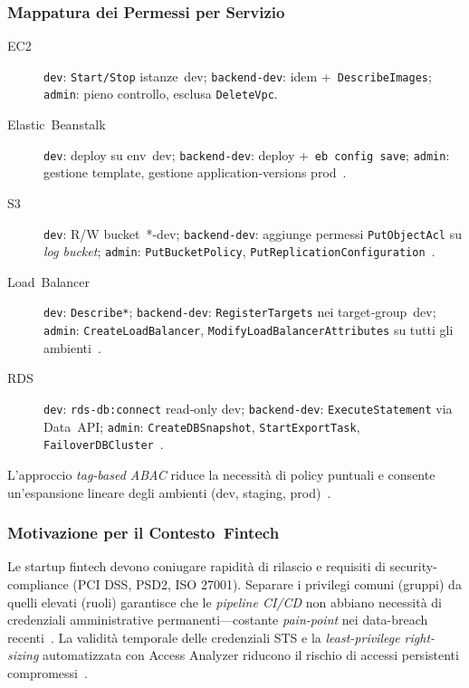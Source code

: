 \subsubsection{Mappatura dei Permessi per Servizio}
\label{subsubsec:mappa_servizi}

\begin{description}
  \item[EC2] \texttt{dev}: \texttt{Start/Stop} istanze dev; \texttt{backend‑dev}: idem + \texttt{DescribeImages}; \texttt{admin}: pieno controllo, esclusa
        \texttt{DeleteVpc}.  
  \item[Elastic Beanstalk] \texttt{dev}: deploy su env dev; \texttt{backend‑dev}: deploy + \texttt{eb config save}; \texttt{admin}: gestione template, gestione
        application‑versions prod \cite{AWSEBRole}.  
  \item[S3] \texttt{dev}: R/W bucket *-dev; \texttt{backend‑dev}: aggiunge permessi
        \texttt{PutObjectAcl} su \emph{log bucket}; \texttt{admin}:
        \texttt{PutBucketPolicy}, \texttt{PutReplicationConfiguration} \cite{AWSS3Security}.  
  \item[Load Balancer] \texttt{dev}: \texttt{Describe*}; \texttt{backend‑dev}: \texttt{RegisterTargets} nei target‑group dev; \texttt{admin}: \texttt{CreateLoadBalancer}, \texttt{ModifyLoadBalancerAttributes} su tutti gli ambienti \cite{AWSELBIAM}.  
  \item[RDS] \texttt{dev}: \texttt{rds-db:connect} read‑only dev; \texttt{backend‑dev}:
        \texttt{ExecuteStatement} via Data API; \texttt{admin}:
        \texttt{CreateDBSnapshot}, \texttt{StartExportTask}, \texttt{FailoverDBCluster} \cite{AWSRDSIAM}.  
\end{description}

L’approccio \emph{tag‑based ABAC} riduce la necessità di policy
puntuali e consente un’espansione lineare degli ambienti (dev, staging,
prod) \cite{AWSEC2IAM,AWSELBIAM}.

\subsubsection{Motivazione per il Contesto Fintech}
\label{subsubsec:motivazione_fintech}
Le startup fintech devono coniugare rapidità di rilascio e requisiti di
security-compliance (PCI DSS, PSD2, ISO 27001).  
Separare i privilegi comuni (gruppi) da quelli elevati (ruoli)
garantisce che le \emph{pipeline CI/CD} non abbiano necessità di
credenziali amministrative permanenti—costante
\emph{pain-point} nei data-breach recenti \cite{MediumIAMGuide}.  
La validità temporale delle credenziali STS e la \emph{least-privilege
right-sizing} automatizzata con Access Analyzer riducono il rischio di
accessi persistenti compromessi \cite{DatadogLeastPrivilege,AWSIAMBestPractices}.

